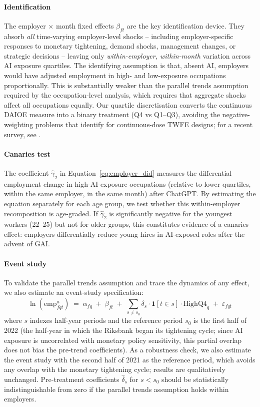 \documentclass[preprint,12pt,authoryear]{elsarticle}
\begin{document}
\paragraph{Identification}
The employer $\times$ month fixed effects $\beta_{ft}$ are the key identification device. They absorb \emph{all} time-varying employer-level shocks -- including employer-specific responses to monetary tightening, demand shocks, management changes, or strategic decisions -- leaving only \emph{within-employer, within-month} variation across AI exposure quartiles. The identifying assumption is that, absent AI, employers would have adjusted employment in high- and low-exposure occupations proportionally. This is substantially weaker than the parallel trends assumption required by the occupation-level analysis, which requires that aggregate shocks affect all occupations equally. Our quartile discretisation converts the continuous DAIOE measure into a binary treatment (Q4 vs Q1--Q3), avoiding the negative-weighting problems that \citet{callaway2024continuous} identify for continuous-dose TWFE designs; for a recent survey, see \citet{roth2023trending}.

\paragraph{Canaries test}
The coefficient $\hat\gamma_2$ in Equation~\eqref{eq:employer_did} measures the differential employment change in high-AI-exposure occupations (relative to lower quartiles, within the same employer, in the same month) after ChatGPT. By estimating the equation separately for each age group, we test whether this within-employer recomposition is age-graded. If $\hat\gamma_2$ is significantly negative for the youngest workers (22--25) but not for older groups, this constitutes evidence of a canaries effect: employers differentially reduce young hires in AI-exposed roles after the advent of GAI.

\paragraph{Event study}
To validate the parallel trends assumption and trace the dynamics of any effect, we also estimate an event-study specification:
\begin{equation}\label{eq:employer_es}
\ln(\text{emp}^{a}_{fqt}) \;=\; \alpha_{fq} \;+\; \beta_{ft} \;+\; \sum_{s \neq s_0} \delta_s \cdot \mathbf{1}[t \in s] \cdot \text{HighQ4}_q \;+\; \varepsilon_{fqt}
\end{equation}
where $s$ indexes half-year periods and the reference period $s_0$ is the first half of 2022 (the half-year in which the Riksbank began its tightening cycle; since AI exposure is uncorrelated with monetary policy sensitivity, this partial overlap does not bias the pre-trend coefficients). As a robustness check, we also estimate the event study with the second half of 2021 as the reference period, which avoids any overlap with the monetary tightening cycle; results are qualitatively unchanged. Pre-treatment coefficients $\hat\delta_s$ for $s < s_0$ should be statistically indistinguishable from zero if the parallel trends assumption holds within employers.
\end{document}
